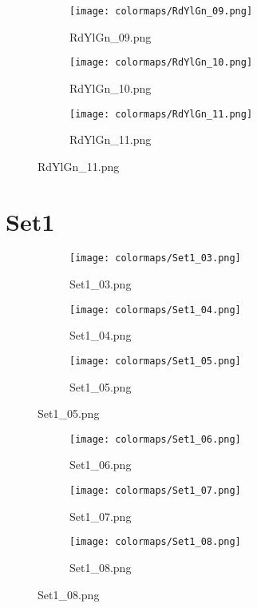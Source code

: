 \documentclass{article}%
\begin{document}
%
\hspace{1cm}\hfill%
\hspace{1cm}\hfill%
\hspace{1cm}\hfill%


\begin{figure}[h!]%
\begin{subfigure}[b]{0.3\linewidth}%
\texttt{[image: colormaps/RdYlGn\_09.png]}%
\caption{RdYlGn\_09.png}%
\end{subfigure}%
\begin{subfigure}[b]{0.3\linewidth}%
\texttt{[image: colormaps/RdYlGn\_10.png]}%
\caption{RdYlGn\_10.png}%
\end{subfigure}%
\begin{subfigure}[b]{0.3\linewidth}%
\texttt{[image: colormaps/RdYlGn\_11.png]}%
\caption{RdYlGn\_11.png}%
\end{subfigure}%
\end{figure}

%
\newpage%
\section{Set1}%
\label{sec:Set1}%
\hspace{1cm}\hfill%
\hspace{1cm}\hfill%
\hspace{1cm}\hfill%


\begin{figure}[h!]%
\begin{subfigure}[b]{0.3\linewidth}%
\texttt{[image: colormaps/Set1\_03.png]}%
\caption{Set1\_03.png}%
\end{subfigure}%
\begin{subfigure}[b]{0.3\linewidth}%
\texttt{[image: colormaps/Set1\_04.png]}%
\caption{Set1\_04.png}%
\end{subfigure}%
\begin{subfigure}[b]{0.3\linewidth}%
\texttt{[image: colormaps/Set1\_05.png]}%
\caption{Set1\_05.png}%
\end{subfigure}%
\end{figure}

%
\hspace{1cm}\hfill%
\hspace{1cm}\hfill%
\hspace{1cm}\hfill%


\begin{figure}[h!]%
\begin{subfigure}[b]{0.3\linewidth}%
\texttt{[image: colormaps/Set1\_06.png]}%
\caption{Set1\_06.png}%
\end{subfigure}%
\begin{subfigure}[b]{0.3\linewidth}%
\texttt{[image: colormaps/Set1\_07.png]}%
\caption{Set1\_07.png}%
\end{subfigure}%
\begin{subfigure}[b]{0.3\linewidth}%
\texttt{[image: colormaps/Set1\_08.png]}%
\caption{Set1\_08.png}%
\end{subfigure}%
\end{figure}
\end{document}
